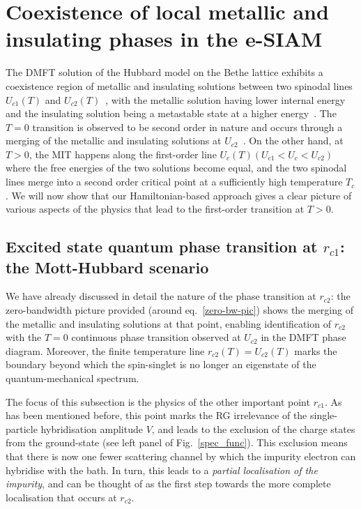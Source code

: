 \documentclass{iopart}
\begin{document}
\section{Coexistence of local metallic and insulating phases in the e-SIAM}
\label{dmft}

The DMFT solution of the Hubbard model on the Bethe lattice exhibits a coexistence region of metallic and insulating solutions between two spinodal lines \(U_{c1}(T)\) and \(U_{c2}(T)\)~\cite{georges1996}, with the metallic solution having lower internal energy and the insulating solution being a metastable state at a higher energy~\cite{moeller_1995,georges1996,bulla_1999,georges_2004_dmft,georges_krauth_1993}.
The \(T=0\) transition is observed to be second order in nature and occurs through a merging of the metallic and insulating solutions at \(U_{c2}\)~\cite{rozenberg_1994_zerotemp,moeller_1995}. On the other hand, at $T>0$, the MIT happens along the first-order line \(U_c(T) \left(U_{c1} < U_c <U_{c2} \right)\) where the free energies of the two solutions become equal, and the two spinodal lines merge into a second order critical point at a sufficiently high temperature \(T_c\). 
We will now show that our Hamiltonian-based approach gives a clear picture of various aspects of the  physics that lead to the first-order transition at $T>0$.

\subsection{Excited state quantum phase transition at \(r_{c1}\): the Mott-Hubbard scenario}

We have already discussed in detail the nature of the phase transition at \(r_{c2}\): the zero-bandwidth picture provided (around eq.~\eqref{zero-bw-pic}) shows the merging of the metallic and insulating solutions at that point, enabling identification of \(r_{c2}\) with the $T=0$ continuous phase transition observed at \(U_{c2}\) in the DMFT phase diagram. Moreover, the finite temperature line \(r_{c2}(T) = U_{c2}(T)\) marks the boundary beyond which the spin-singlet is no longer an eigenstate of the quantum-mechanical spectrum.

The focus of this subsection is the physics of the other important point \(r_{c1}\). As has been mentioned before, this point marks the RG irrelevance of the single-particle hybridisation amplitude \(V\), and leads to the exclusion of the charge states from the ground-state (see left panel of Fig.~\eqref{spec_func}). This exclusion means that there is now one fewer scattering channel by which the impurity electron can hybridise with the bath. In turn, this leads to a {\it partial localisation of the impurity}, and can be thought of as the first step towards the more complete localisation that occurs at \(r_{c2}\).
\end{document}
